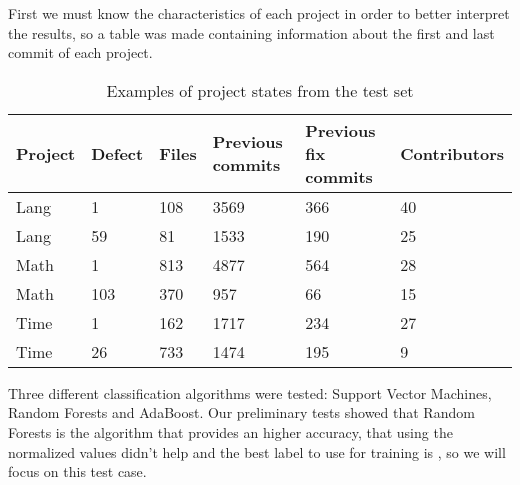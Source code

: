 First we must know the characteristics of each project in order to better interpret the results, so a table was made containing information about the first and last commit of each
project.
%
\begin{table}[H]
\centering
\begin{tabular}{|l|l|l|l|l|l|}
\hline
\textbf{Project} & \textbf{Defect} & \textbf{Files} & \textbf{Previous commits} & \textbf{Previous fix commits} & \textbf{Contributors} \\ \hline
Lang             & 1               & 108            & 3569                      & 366                           & 40                    \\ \hline
Lang             & 59              & 81             & 1533                      & 190                           & 25                    \\ \hline
Math             & 1               & 813            & 4877                      & 564                           & 28                    \\ \hline
Math             & 103             & 370            & 957                       & 66                            & 15                    \\ \hline
Time             & 1               & 162            & 1717                      & 234                           & 27                    \\ \hline
Time             & 26              & 733            & 1474                      & 195                           & 9                     \\ \hline
\end{tabular}
\caption{Examples of project states from the test set}
\label{test-set-examples}
\end{table}

Three different classification algorithms were tested: Support Vector Machines, Random Forests and AdaBoost.
Our preliminary tests showed that Random Forests is the algorithm that provides an higher accuracy, that using the normalized values didn't help and the best label to use for training is , so we will focus on this test case.

